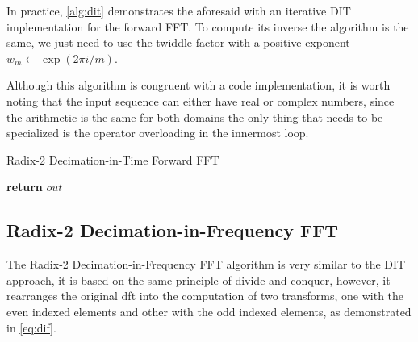 \documentclass[
  oneside,
  11pt, a4paper,
  footinclude=true,
  headinclude=true,
  cleardoublepage=empty
]{scrbook}
\begin{document}
In practice, \autoref{alg:dit} demonstrates the aforesaid with an iterative DIT implementation for the forward FFT. To compute its inverse the algorithm is the same, we just need to use the twiddle factor with a positive exponent $w_{m} \gets \exp(2\pi i / m)$.

Although this algorithm is congruent with a code implementation, it is worth noting that the input sequence can either have real or complex numbers, since the arithmetic is the same for both domains the only thing that needs to be specialized is the operator overloading in the innermost loop. 
\newline

\begin{algorithm}[H]
    \caption{Radix-2 Decimation-in-Time Forward FFT} \label{alg:dit}


    \textbf{return} $out$\;
\end{algorithm}


\subsection{Radix-2 Decimation-in-Frequency FFT}  \label{subsec:radix-2-decimation-in-frequency-fft}

The Radix-2 Decimation-in-Frequency FFT algorithm is very similar to the DIT approach, it is based on the same principle of divide-and-conquer, however, it rearranges the original \acrshort{dft} into the computation of two transforms, one with the even indexed elements and other with the odd indexed elements, as demonstrated in \autoref{eq:dif}.
\end{document}
